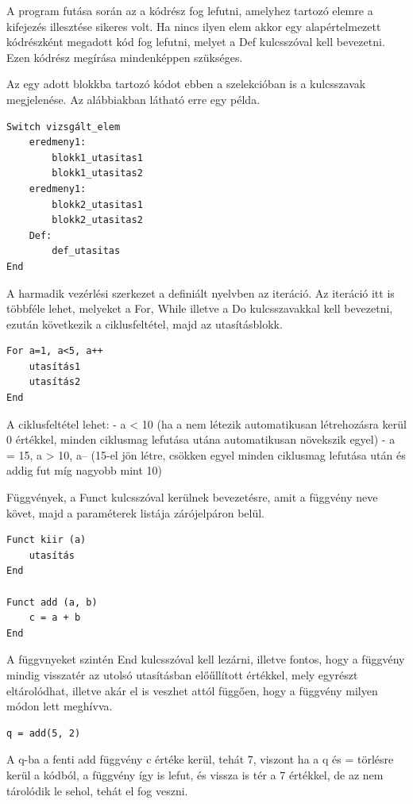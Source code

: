 A program futása során az a kódrész fog lefutni, amelyhez tartozó elemre a kifejezés illesztése sikeres volt. Ha nincs ilyen elem akkor egy alapértelmezett kódrészként megadott kód fog lefutni, melyet a Def kulcsszóval kell bevezetni. Ezen kódrész megírása mindenképpen szükséges.

Az egy adott blokkba tartozó kódot ebben a szelekcióban is a kulcsszavak megjelenése. Az alábbiakban látható erre egy példa.

\begin{verbatim}
Switch vizsgált_elem
	eredmeny1:
		blokk1_utasitas1
		blokk1_utasitas2
	eredmeny1:
		blokk2_utasitas1
		blokk2_utasitas2
	Def:
		def_utasitas
End
\end{verbatim}

A harmadik vezérlési szerkezet a definiált nyelvben az iteráció. Az iteráció itt is többféle lehet, melyeket a For, While illetve a Do kulcsszavakkal kell bevezetni, ezután következik a ciklusfeltétel, majd az utasításblokk.

\begin{verbatim}
For a=1, a<5, a++
	utasítás1
	utasítás2
End
\end{verbatim}

A ciklusfeltétel lehet:
- a < 10 (ha a nem létezik automatikusan létrehozásra kerül 0 értékkel, minden ciklusmag lefutása utána automatikusan növekszik egyel)
- a = 15, a > 10, a-- (15-el jön létre, csökken egyel minden ciklusmag lefutása után és addig fut míg nagyobb mint 10)

Függvények, a Funct kulcsszóval kerülnek bevezetésre, amit a függvény neve követ, majd a paraméterek listája zárójelpáron belül.

\begin{verbatim}
Funct kiir (a)
	utasítás
End

Funct add (a, b)
	c = a + b
End
\end{verbatim}

A függvnyeket szintén End kulcsszóval kell lezárni, illetve fontos, hogy a függvény mindig visszatér az utolsó utasításban előűllított értékkel, mely egyrészt eltárolódhat, illetve akár el is veszhet attól függően, hogy a függvény milyen módon lett meghívva.

\begin{verbatim}
q = add(5, 2)
\end{verbatim}

A q-ba a fenti add függvény c értéke kerül, tehát 7, viszont ha a q és = törlésre kerül a kódból, a függvény így is lefut, és vissza is tér a 7 értékkel, de az nem tárolódik le sehol, tehát el fog veszni.

